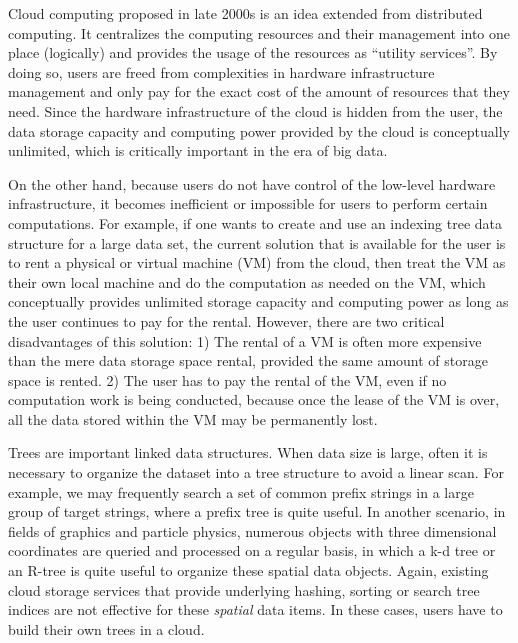 \documentclass[10pt, conference, compsocconf]{IEEEtran}
\begin{document}
Cloud computing proposed in late 2000s is an idea extended from
distributed computing. It centralizes the computing resources and
their management into one place (logically) and provides the usage of
the resources as ``utility services''. By doing so, users are freed
from complexities in hardware infrastructure management and 
only pay for the exact cost of the amount of resources that they
need. Since the hardware infrastructure of the cloud is hidden from the 
user, the data storage capacity and computing power provided by the
cloud is conceptually unlimited, which is critically important in the
era of big data.

On the other hand, because users do not have control of the
low-level hardware infrastructure, it becomes inefficient or
impossible for users to perform certain computations. For example, if one
wants to create and use an indexing tree data structure for a large
data set, the current solution that is available for the user is to
rent a physical or virtual machine (VM) from the cloud, then treat the VM as their
own local machine and do the computation as needed on the VM, which
conceptually provides unlimited storage capacity and computing power
as long as the user continues to pay for the rental. However, there are two critical
disadvantages of this solution: 1) The rental of a VM is often more
expensive than the mere data storage space rental, provided the same
amount of storage space is rented.  2) The user has to pay the rental
of the VM, even if no computation work is being conducted, because
once the lease of the VM is over, all the data stored within the VM
may be permanently lost. 



Trees are important linked data structures.
When data size is large, often it is necessary to organize the dataset 
into a tree structure to avoid a linear scan. For example, 
we may frequently search a set of common prefix strings in a large group of target strings, where
a prefix tree is quite useful. 
In another scenario, in fields of graphics and particle physics, numerous objects 
with three dimensional coordinates are queried and processed on a regular basis, 
in which a k-d tree or an R-tree is quite useful to organize these spatial data objects. 
Again, existing cloud storage services that provide underlying hashing, sorting or search tree indices 
are not effective for these \emph{spatial} data items. In these cases, users have to build their own trees in a cloud.
\end{document}
